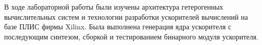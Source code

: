 \Conclusion

В ходе лабораторной работы были изучены архитектура гетерогенных
вычислительных систем и технологии разработки ускорителей вычислений на
базе ПЛИС фирмы Xilinx. Была выполнена генерация ядра ускорителя с
последующим
синтезом, сборкой
и тестированием
бинарного
модуля ускорителя.
